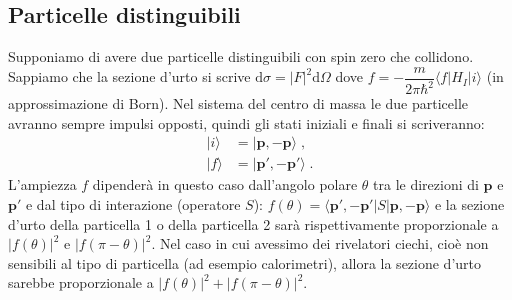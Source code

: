 \documentclass[12pt,a4paper]{report}
\theoremstyle{definition}
\numberwithin{equation}{section}
\newcommand{\diff}[1][]{\mathrm{d}#1}
\newcommand{\bra}{\langle}
\newcommand{\ket}{\rangle}
\begin{document}
\subsection{Particelle distinguibili}
Supponiamo di avere due particelle distinguibili con spin zero che collidono. Sappiamo che la sezione d'urto si scrive $\diff{\sigma}=|F|^2\diff{\Omega}$ dove $f=-\dfrac{m}{2\pi\hbar^2}\bra f|H_I|i\ket$ (in approssimazione di Born). Nel sistema del centro di massa le due particelle avranno sempre impulsi opposti, quindi gli stati iniziali e finali si scriveranno:
\begin{align*}
|i\ket&=|\mathbf{p},-\mathbf{p}\ket\;, \\
|f\ket&=|\mathbf{p}',-\mathbf{p}'\ket\;.
\end{align*}
L'ampiezza $f$ dipenderà in questo caso dall'angolo polare $\theta$ tra le direzioni di $\mathbf{p}$ e $\mathbf{p}'$ e dal tipo di interazione (operatore $S$): $f(\theta)=\bra \mathbf{p}',-\mathbf{p}'|S|\mathbf{p},-\mathbf{p}\ket$ e la sezione d'urto della particella 1 o della particella 2 sarà rispettivamente proporzionale a $|f(\theta)|^2$ e $|f(\pi-\theta)|^2$. Nel caso in cui avessimo dei rivelatori ciechi, cioè non sensibili al tipo di particella (ad esempio calorimetri), allora la sezione d'urto sarebbe proporzionale a $|f(\theta)|^2+|f(\pi-\theta)|^2$.
\end{document}
